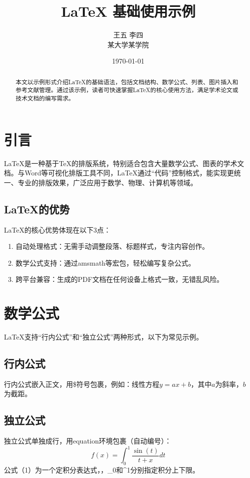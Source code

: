 \documentclass[12pt,a4paper]{article}
\title{LaTeX 基础使用示例}
\author{王五 \quad 李四 \\ 某大学某学院}  %
\date{\today}  %
\begin{document}
\maketitle

\begin{abstract}
本文以示例形式介绍LaTeX的基础语法，包括文档结构、数学公式、列表、图片插入和参考文献管理。通过该示例，读者可快速掌握LaTeX的核心使用方法，满足学术论文或技术文档的编写需求。
\end{abstract}

\tableofcontents
\clearpage  %

\section{引言}
LaTeX是一种基于TeX的排版系统，特别适合包含大量数学公式、图表的学术文档。与Word等可视化排版工具不同，LaTeX通过“代码”控制格式，能实现更统一、专业的排版效果，广泛应用于数学、物理、计算机等领域。

\subsection{LaTeX的优势}
LaTeX的核心优势体现在以下3点：
\begin{enumerate}[1.]  %
    \item 自动处理格式：无需手动调整段落、标题样式，专注内容创作。
    \item 数学公式支持：通过amsmath等宏包，轻松编写复杂公式。
    \item 跨平台兼容：生成的PDF文档在任何设备上格式一致，无错乱风险。
\end{enumerate}

\section{数学公式}
LaTeX支持“行内公式”和“独立公式”两种形式，以下为常见示例。

\subsection{行内公式}
行内公式嵌入正文，用\$符号包裹，例如：线性方程\( y = ax + b \)，其中\( a \)为斜率，\( b \)为截距。

\subsection{独立公式}
独立公式单独成行，用equation环境包裹（自动编号）：
\begin{equation}  %
    f(x) = \int_{0}^{1} \frac{\sin(t)}{t + x} dt
\end{equation}
公式（1）为一个定积分表达式，，_{0}和^{1}分别指定积分上下限。
\end{document}

